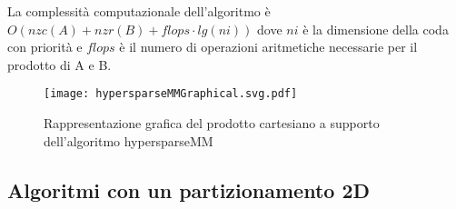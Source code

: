 La complessità computazionale dell'algoritmo è $O(nzc(A) + nzr(B) +flops \cdot lg( ni))$
dove $ni$ è la dimensione della coda con priorità e $flops$ è il numero di
operazioni aritmetiche necessarie per il prodotto di A e B.\\


\begin{figure}[H]
  \centering \texttt{[image: hypersparseMMGraphical.svg.pdf]}
  \caption[rappresentazione grafica hypersparseMM]{Rappresentazione grafica del prodotto cartesiano 
   a supporto dell'algoritmo hypersparseMM} \decoRule \label{fig:hypersparseMMGraphical}
\end{figure}


\subsection{Algoritmi con un partizionamento 2D}

